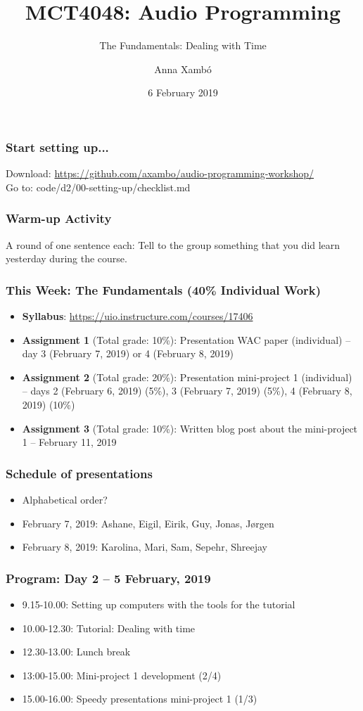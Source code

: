 \documentclass[screen, aspectratio=43]{beamer}
\title[AP-intro]{MCT4048: Audio Programming}
\subtitle{The Fundamentals: Dealing with Time}
\author[A. Xamb{\'o}]{Anna Xamb{\'o}}
\institute[NTNU]{Department of Music, NTNU}
\date{6 February 2019}
\begin{document}
\begin{frame}
  \titlepage
\end{frame}


%
\begin{frame}
\frametitle{Start setting up...}
Download: \url{https://github.com/axambo/audio-programming-workshop/} 
\\
\vspace{10 mm}
Go to: \textrm{code/d2/00-setting-up/checklist.md}
\end{frame}
%
\begin{frame}
\frametitle{Warm-up Activity}
A round of one sentence each: Tell to the group something that you did  learn yesterday during the course.
\end{frame}
%
\begin{frame}
\frametitle{This Week: The Fundamentals (40\% Individual Work)}
\begin{itemize}
\item \textbf{Syllabus}: \url{https://uio.instructure.com/courses/17406}
\item \textbf{Assignment 1} (Total grade: 10\%): Presentation WAC paper (individual) -- day 3 (February 7, 2019) or 4 (February 8, 2019)
\item \textbf{Assignment 2} (Total grade: 20\%): Presentation mini-project 1 (individual) -- days 2 (February 6, 2019) (5\%), 3 (February 7, 2019) (5\%), 4 (February 8, 2019) (10\%)
\item \textbf{Assignment 3} (Total grade: 10\%): Written blog post about the mini-project 1 -- February 11, 2019
\end{itemize}
\end{frame}
%
\begin{frame}
\frametitle{Schedule of presentations}
\begin{itemize}
\item Alphabetical order?
\item February 7, 2019: Ashane, Eigil, Eirik, Guy, Jonas, Jørgen
\item February 8, 2019: Karolina, Mari, Sam, Sepehr, Shreejay
\end{itemize}
\end{frame}
%
\begin{frame}
\frametitle{Program: Day 2 -- 5 February, 2019}
\begin{itemize}
\item 9.15-10.00: Setting up computers with the tools for the tutorial
\item 10.00-12.30: Tutorial: Dealing with time
\item 12.30-13.00: Lunch break
\item 13:00-15.00: Mini-project 1 development (2/4)
\item 15.00-16.00: Speedy presentations mini-project 1 (1/3)
\end{itemize}
\end{frame}
\end{document}
